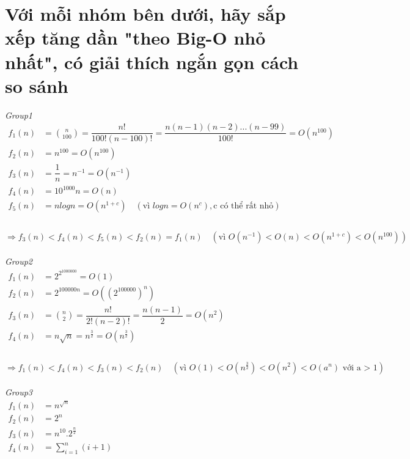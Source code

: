\documentclass[12pt, letterpaper]{article}
\begin{document}
\section{Với mỗi nhóm bên dưới, hãy sắp xếp tăng dần "theo Big-O nhỏ nhất", có giải thích ngắn gọn cách so sánh}
\textit{Group1}\\
$\begin{aligned}
    f_1(n) &= \binom{n}{100} = \dfrac{n!}{100!(n-100)!} = \dfrac{n(n-1)(n-2)...(n-99)}{100!} = O(n^{100}) \\
    f_2(n) &= n^100 = O(n^{100}) \\
    f_3(n) &= \dfrac{1}{n} = n^{-1} = O(n^{-1}) \\
    f_4(n) &= 10^{1000} n = O(n) \\
    f_5(n) &= nlogn = O(n^{1 + c}) \quad (\text{vì } logn = O(n^c), \text{c có thể rất nhỏ}) \\
\end{aligned}$ \\ \\
$\Rightarrow f_3(n) < f_4(n) < f_5(n) < f_2(n) = f_1(n) \quad (\text{vì } O(n^{-1}) < O(n) < O(n^{1+c}) < O(n^{100}))$\\ \\
\textit{Group2}\\
$\begin{aligned}
    f_1(n) &= 2^{2^{1000000}} = O(1) \\
    f_2(n) &= 2^{100000n} = O((2^{100000})^n) \\
    f_3(n) &= \binom{n}{2} = \dfrac{n!}{2!(n-2)!} = \dfrac{n(n-1)}{2} = O(n^2) \\
    f_4(n) &= n\sqrt{n} = n^{\frac{3}{2}} = O(n^{\frac{3}{2}})\\
\end{aligned}$ \\ \\
$\Rightarrow f_1(n) < f_4(n) < f_3(n) < f_2(n) \quad (\text{vì } O(1) < O(n^{\frac{3}{2}}) < O(n^2) < O(a^n) \text{ với a > 1})$\\ \\
\textit{Group3}\\
$\begin{aligned}
    f_1(n) &= n^{\sqrt{n}} \\
    f_2(n) &= 2^n \\
    f_3(n) &= n^{10}.2^{\frac{n}{2}} \\
    f_4(n) &= \sum_{i=1}^{n} (i+1) \\
\end{aligned}$ \\
\end{document}
